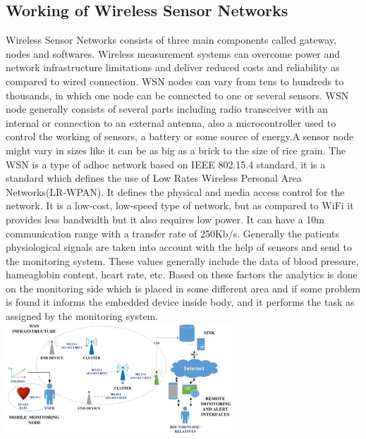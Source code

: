 \documentclass[conference]{IEEEtran}
\begin{document}
\subsection{Working of Wireless Sensor Networks}
Wireless Sensor Networks consists of three main components called gateway, nodes and softwares. Wireless measurement systems can overcome power and network infrastructure limitations and deliver reduced costs and reliability as compared to wired connection. WSN nodes can vary from tens to hundreds to thousands, in which one node can be connected to one or several sensors. WSN node generally consists of several parts including radio transceiver with an internal or connection to an external antenna, also a microcontroller used to control the working of sensors, a battery or some source of energy.A sensor node might vary in sizes like it can be as big as a brick to the size of rice grain.
\linebreak
\linebreak
The WSN is a type of adhoc network based on IEEE 802.15.4 standard, it is a standard which defines the use of Low Rates Wireless Personal Area Networks(LR-WPAN). It defines the physical and media access control for the network. It is a low-cost, low-speed type of network, but as compared to WiFi it provides less bandwidth but it also requires low power. It can have a 10m communication range with a transfer rate of 250Kb/s.
\linebreak
Generally the patients physiological signals are taken into account with the help of sensors and send to the monitoring system. These values generally include the data of blood pressure, hameaglobin content, heart rate, etc. Based on these factors the analytics is done on the monitoring side which is placed in some different area and if some problem is found it informs the embedded device inside body, and it performs the task as assigned by the monitoring system.
\linebreak
\linebreak
\linebreak
\includegraphics[width=8.5cm]{cluster}
\end{document}
